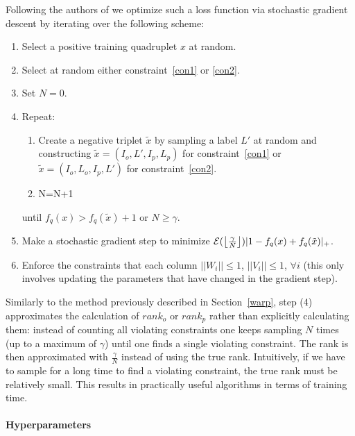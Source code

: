 Following the authors of \cite{wsabie} we optimize such a loss function via 
stochastic gradient descent by iterating over the following scheme:
\begin{enumerate}
\item Select a positive training quadruplet $x$ at random.
\item Select at random either constraint~\eqref{con1} or \eqref{con2}.
\item Set $N=0$.
\item Repeat:
{
  \begin{enumerate}
  \item Create a negative triplet $\tilde{x}$ by sampling a label $L'$ at random 
and constructing  $\tilde{x} = (I_o,L',I_p,L_p)$ for constraint~\eqref{con1}  
or $\tilde{x} = (I_o,L_o,I_p,L')$ for constraint~\eqref{con2}.
  \item N=N+1
  \end{enumerate}
}
until $f_q(x) > f_q(\tilde{x}) + 1$ or $N \geq \gamma$.
\item Make a stochastic gradient step to minimize
  ${\cal E}(\left \lfloor \frac{\gamma}{N} \right \rfloor) |1-f_q(x)+f_q(\tilde{x})|_{+} $.
\item Enforce the constraints that each column $||W_i|| \leq 1$, $||V_i|| \leq 1$, $\forall i$ (this only involves updating the parameters that have changed in the gradient step).
\end{enumerate}


Similarly to the method previously described in Section~\ref{warp}, 
step (4) approximates the calculation of
$rank_o$ or $rank_p$ rather than explicitly calculating them: instead of counting
all violating constraints one keeps sampling $N$ times (up to a maximum of $\gamma$) 
until one finds a single violating constraint.
The rank is then approximated with  $\frac{\gamma}{N}$ instead of using the true rank. 
Intuitively, if we have to sample for a long time to
find a violating constraint, the true rank must be relatively small.
This results in practically useful algorithms in terms of training time.

\paragraph{Hyperparameters}


